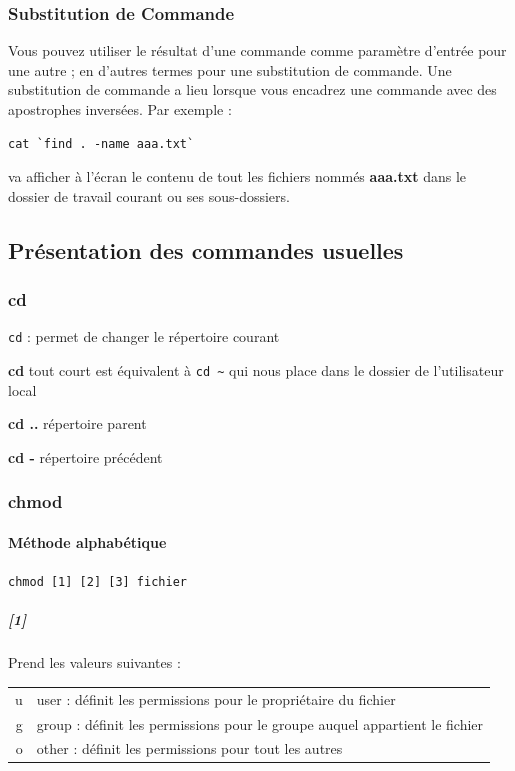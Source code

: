\documentclass[a4paper,twoside]{article}
\begin{document}
\subsubsection{Substitution de Commande}
Vous pouvez utiliser le résultat d'une commande comme paramètre d'entrée pour une autre ; en d'autres termes pour une substitution de commande. Une substitution de commande a lieu lorsque vous encadrez une commande avec des apostrophes inversées. Par exemple :

\begin{verbatim}
cat `find . -name aaa.txt`
\end{verbatim}

va afficher à l'écran le contenu de tout les fichiers nommés \textbf{aaa.txt} dans le dossier de travail courant ou ses sous-dossiers.


\subsection{Présentation des commandes usuelles}

\subsubsection{cd}
\verb|cd| : permet de changer le répertoire courant

\textbf{cd} tout court est équivalent à \verb|cd ~|  qui nous place dans le dossier de l'utilisateur local

\textbf{cd ..} répertoire parent

\textbf{cd -} répertoire précédent

\subsubsection{chmod}
\paragraph{Méthode alphabétique}
\verb|chmod [1] [2] [3] fichier|
\subparagraph{[1]}
Prend les valeurs suivantes :
\begin{center}
\begin{tabular}{rl}
u & user : définit les permissions pour le propriétaire du fichier\\
g & group : définit les permissions pour le groupe auquel appartient le fichier\\
o & other : définit les permissions pour tout les autres
\end{tabular}
\end{center}
\end{document}
